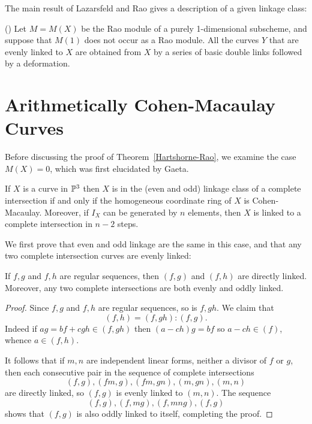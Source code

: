 
The main result of Lazarsfeld and Rao gives a description of a given linkage class:

\begin{theorem}(\cite{Lazarsfeld-Rao})\label{description of a linkage class}
Let $M= M(X)$ be the Rao module of a purely 1-dimensional subscheme, and suppose that $M(1)$ does not occur as a Rao module. All the curves $Y$ that are evenly linked to $X$ are obtained from $X$ by a series of basic double links followed by a deformation.
\end{theorem}

\section{Arithmetically Cohen-Macaulay Curves}

Before discussing the proof of Theorem~\ref{Hartshorne-Rao}, we examine the case $M(X) = 0$, which was first elucidated by Gaeta. 

\begin{theorem}\label{Gaeta}
If $X$ is a curve in ${\mathbb P}^3$  then $X$ is in the (even and odd) linkage class of a complete intersection if and only if the homogeneous
coordinate ring of $X$ is Cohen-Macaulay. Moreover, if $I_X$ can be generated by $n$ elements, then $X$ is linked to
a complete intersection in $n-2$ steps.
\end{theorem}

We first prove that even and odd linkage are the same in this case, and that any two complete intersection curves
are evenly linked:

\begin{lemma}
If $f,g$ and $f,h$ are regular sequences, then $(f,g)$ and $(f,h)$ are directly linked. Moreover, 
any  two complete intersections are both evenly and oddly linked.
\end{lemma}
\begin{proof}
Since $f,g$ and $f,h$ are regular sequences, so is $f,gh$. We claim that
$$
(f,h) = (f,gh):(f,g).
$$
Indeed if $ag = bf+cgh\in (f,gh)$ then $(a-ch)g = bf$ so $a-ch \in (f)$, whence $a\in (f,h)$.

It follows that if $m,n$ are independent linear forms, neither a divisor of $f$ or $g$, then each consecutive pair
in the sequence of complete intersections
$$
(f,g), (fm,g), (fm,gn), (m,gn),(m,n)
$$
are directly linked, so $(f,g)$ is evenly linked to $(m,n)$. The sequence 
$$
(f,g),(f,mg), (f,mng), (f,g)
$$
shows that $(f,g)$ is also oddly linked to itself, completing the proof.
\end{proof}

